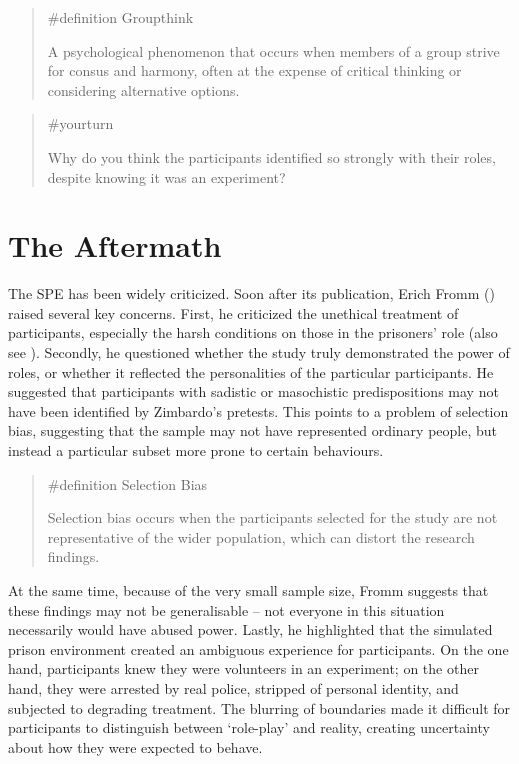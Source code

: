 \documentclass[
  letterpaper,
]{book}
\begin{document}
\begin{quote}
\label{def-groupthink}{\#definition} Groupthink

A psychological phenomenon that occurs when members of a group strive
for consus and harmony, often at the expense of critical thinking or
considering alternative options.
\end{quote}

\begin{quote}
{\#yourturn}

Why do you think the participants identified so strongly with their
roles, despite knowing it was an experiment?
\end{quote}

\section{The Aftermath}\label{the-aftermath-12}

The SPE has been widely criticized. Soon after its publication, Erich
Fromm () raised several key
concerns. First, he criticized the unethical treatment of participants,
especially the harsh conditions on those in the prisoners' role (also
see ). Secondly, he
questioned whether the study truly demonstrated the power of roles, or
whether it reflected the personalities of the particular participants.
He suggested that participants with sadistic or masochistic
predispositions may not have been identified by Zimbardo's pretests.
This points to a problem of selection bias, suggesting that the sample
may not have represented ordinary people, but instead a particular
subset more prone to certain behaviours.

\begin{quote}
\label{def-selectionbias}{\#definition} Selection Bias

Selection bias occurs when the participants selected for the study are
not representative of the wider population, which can distort the
research findings.
\end{quote}

At the same time, because of the very small sample size, Fromm suggests
that these findings may not be generalisable -- not everyone in this
situation necessarily would have abused power. Lastly, he highlighted
that the simulated prison environment created an ambiguous experience
for participants. On the one hand, participants knew they were
volunteers in an experiment; on the other hand, they were arrested by
real police, stripped of personal identity, and subjected to degrading
treatment. The blurring of boundaries made it difficult for participants
to distinguish between `role-play' and reality, creating uncertainty
about how they were expected to behave.
\end{document}

